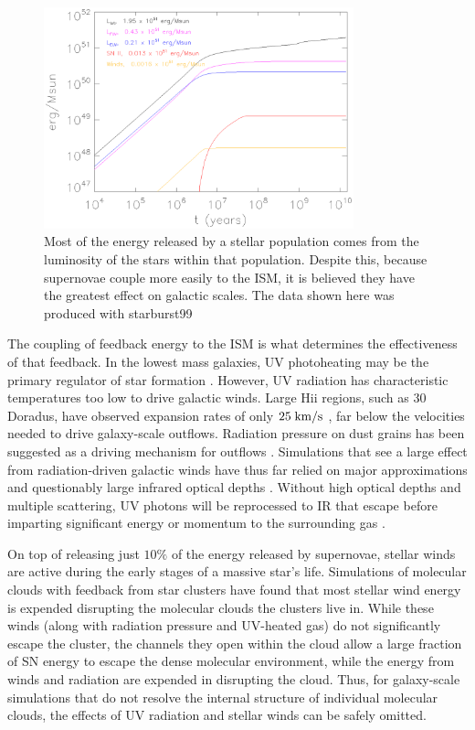 \begin{figure}
    \includegraphics[width=0.8\textwidth]{FB_budget.ps}
    \caption[Stellar feedback energy budget]{Most of the energy released by a
    stellar population comes from the luminosity of the stars within that
    population.  Despite this, because supernovae couple more easily to the ISM,
    it is believed they have the greatest effect on galactic scales.  The data
    shown here was produced with {\sc starburst99} \citep{Leitherer1999}}
\end{figure}

The coupling of feedback energy to the ISM is what determines the effectiveness
of that feedback.  In the lowest mass galaxies, UV photoheating may be the
primary regulator of star formation \citep{Efstathiou1992}.    However, UV
radiation has characteristic temperatures too low to drive galactic winds.
Large {\sc Hii} regions, such as 30 Doradus, have observed expansion rates of
only $25\;\rm{km/s}$ \citep{Chu1994}, far below the velocities needed to drive
galaxy-scale outflows.  Radiation pressure on dust grains has been suggested as
a driving mechanism for outflows \citep{Murray2011}.  Simulations that see a
large effect from radiation-driven galactic winds have thus far relied on major approximations
\citep{Roskar2014,Agertz2015} and questionably large infrared optical depths
\citep{Hopkins2014}.  Without high optical depths and multiple scattering, UV
photons will be reprocessed to IR that escape before imparting significant
energy or momentum to the surrounding gas \citep{Dale2005,Walch2012,Krumholz2013}.

On top of releasing just $10\%$ of the energy released by supernovae, stellar
winds are active during the early stages of a massive star's life.   Simulations
of molecular clouds with feedback from star clusters
\citep{Gendelev2012,Rogers2013} have found that most stellar wind energy is
expended disrupting the molecular clouds the clusters live in.  While these
winds (along with radiation pressure and UV-heated gas) do not significantly
escape the cluster, the channels they open within the cloud allow a large
fraction of SN energy to escape the dense molecular environment, while the
energy from winds and radiation are expended in disrupting the cloud.  Thus, for
galaxy-scale simulations that do not resolve the internal structure of
individual molecular clouds, the effects of UV radiation and stellar winds can
be safely omitted.


